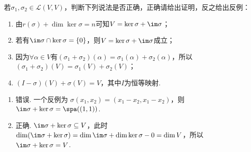 \begin{exercise}
\begin{exgroup}
        \item 若$\sigma_1,\sigma_2\in \mathcal{L}(V,V)$，判断下列说法是否正确，正确请给出证明，反之给出反例：
        \begin{enumerate}
            \item 由$r(\sigma)+\dim\ker\sigma=n$可知$V=\ker\sigma+\im \sigma$；

            \item 若有$\im \sigma \cap \ker \sigma = \{0\}$，则$V=\ker\sigma+\im \sigma$成立；

            \item 因为$\forall \alpha \in V$有$(\sigma_1+\sigma_2)(\alpha)=\sigma_1(\alpha)+\sigma_2(\alpha)$，所以$(\sigma_1+\sigma_2)(V)=\sigma_1(V)+\sigma_2(V)$；

            \item $(I-\sigma)(V)+\sigma(V)=V$，其中$I$为恒等映射.
        \end{enumerate}

        \begin{answer}
            \begin{enumerate}
                \item 错误. 一个反例为 $ \sigma(x_1, x_2) = (x_1 - x_2, x_1 - x_2) $，则 $ \im \sigma + \ker \sigma = \spa((1, 1)) $.

                \item 正确. $ \im \sigma + \ker \sigma \subseteq V $，此时 $ \dim(\im \sigma + \ker \sigma) = \dim \im \sigma + \dim \ker \sigma - 0 = \dim V $，所以 $ \im \sigma + \ker \sigma = V $.


\end{enumerate}
\end{answer}
\end{exgroup}
\end{exercise}
